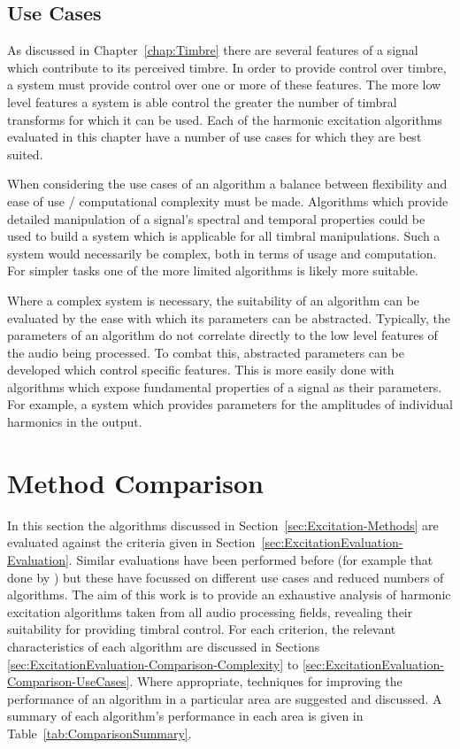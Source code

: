 	\subsection{Use Cases}
	\label{sec:ExcitationEvaluation-Evaluation-UseCases}
		As discussed in Chapter~\ref{chap:Timbre} there are several features of a signal which contribute to its
		perceived timbre. In order to provide control over timbre, a system must provide control over one or more
		of these features. The more low level features a system is able control the greater the number of timbral
		transforms for which it can be used. Each of the harmonic excitation algorithms evaluated in this chapter
		have a number of use cases for which they are best suited.
		
		When considering the use cases of an algorithm a balance between flexibility and ease of use /
		computational complexity must be made. Algorithms which provide detailed manipulation of a signal's
		spectral and temporal properties could be used to build a system which is applicable for all timbral
		manipulations. Such a system would necessarily be complex, both in terms of usage and computation. For
		simpler tasks one of the more limited algorithms is likely more suitable.
		
		Where a complex system is necessary, the suitability of an algorithm can be evaluated by the ease with
		which its parameters can be abstracted. Typically, the parameters of an algorithm do not correlate directly
		to the low level features of the audio being processed. To combat this, abstracted parameters can be
		developed which control specific features. This is more easily done with algorithms which expose
		fundamental properties of a signal as their parameters. For example, a system which provides parameters
		for the amplitudes of individual harmonics in the output.

\section{Method Comparison}
\label{sec:ExcitationEvaluation-Comparison}
	In this section the algorithms discussed in Section~\ref{sec:Excitation-Methods} are evaluated against the criteria
	given in Section~\ref{sec:ExcitationEvaluation-Evaluation}. Similar evaluations have been performed before (for
	example that done by \citet{larsen2004audio}) but these have focussed on different use cases and reduced numbers of
	algorithms. The aim of this work is to provide an exhaustive analysis of harmonic excitation algorithms taken from
	all audio processing fields, revealing their suitability for providing timbral control. For each criterion, the
	relevant characteristics of each algorithm are discussed in Sections
	\ref{sec:ExcitationEvaluation-Comparison-Complexity} to \ref{sec:ExcitationEvaluation-Comparison-UseCases}. Where
	appropriate, techniques for improving the performance of an algorithm in a particular area are suggested and
	discussed. A summary of each algorithm's performance in each area is given in Table~\ref{tab:ComparisonSummary}.

